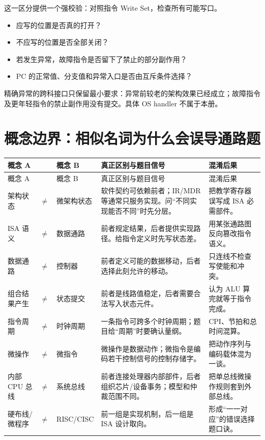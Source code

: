 \documentclass[UTF8,fontset=fandol,11pt,a4paper]{ctexart}
\renewcommand{\arraystretch}{1.22}
\begin{document}
这一区分提供一个强校验：对照指令 Write Set，检查所有可能写口。
\begin{itemize}
  \item 应写的位置是否真的打开？
  \item 不应写的位置是否全部关闭？
  \item 若发生异常，故障指令是否留下了禁止的部分副作用？
  \item PC 的正常值、分支值和异常入口是否由互斥条件选择？
\end{itemize}

精确异常的跨科接口只保留最小要求：异常前较老的架构效果已经成立；故障指令及更年轻指令的禁止副作用没有提交。具体 OS handler 不属于本册。

\section{概念边界：相似名词为什么会误导通路题}

\begingroup
\footnotesize
\renewcommand{\arraystretch}{1.28}
\begin{longtable}{L{2.25cm}C{0.45cm}L{2.25cm}L{6.0cm}L{3.0cm}}
\toprule
概念 A & & 概念 B & 真正区别与题目信号 & 混淆后果 \\
\midrule
\endfirsthead
\toprule
概念 A & & 概念 B & 真正区别与题目信号 & 混淆后果 \\
\midrule
\endhead
架构状态 & $\neq$ & 微架构状态 & 软件契约可依赖前者；IR/MDR 等通常只服务实现。问“不同实现能否不同”时先分层。 & 把教学寄存器误写成 ISA 必需部件。 \\
\addlinespace
ISA 语义 & $\neq$ & 数据通路 & 前者规定结果，后者提供实现路径。给指令定义时先写状态差。 & 用某张通路图反向篡改指令语义。 \\
\addlinespace
数据通路 & $\neq$ & 控制器 & 前者定义可能的数据移动，后者选择此刻允许的移动。 & 只连线不检查写使能和冲突。 \\
\addlinespace
组合结果产生 & $\neq$ & 状态提交 & 前者是线路值稳定，后者需要合法写入状态元件。 & 认为 ALU 算完就等于指令完成。 \\
\addlinespace
指令周期 & $\neq$ & 时钟周期 & 一条指令可跨多个时钟周期；题目给“周期”时要确认量纲。 & CPI、节拍和总时间混算。 \\
\addlinespace
微操作 & $\neq$ & 微指令 & 微操作是数据动作；微指令是编码若干控制信号的控制存储字。 & 把动作序列与编码载体混为一谈。 \\
\addlinespace
内部 CPU 总线 & $\neq$ & 系统总线 & 前者连接处理器内部部件，后者组织芯片/设备事务；模型和仲裁范围不同。 & 把单总线微操作规则套到外部总线。 \\
\addlinespace
硬布线/微程序 & $\neq$ & RISC/CISC & 前一组是实现机制，后一组是 ISA 设计取向。 & 形成“一一对应”的错误选择题口诀。 \\
\bottomrule
\end{longtable}
\endgroup
\end{document}
